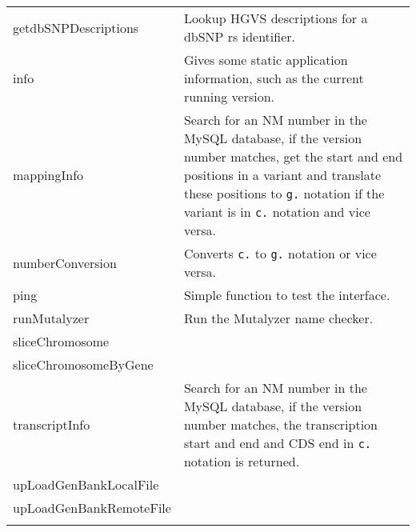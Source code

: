 \begin{longtable}{l|X}
  getdbSNPDescriptions     & Lookup HGVS descriptions for a dbSNP rs
    identifier.\\
  info                     & Gives some static application information, such as
    the current running version.\\
  mappingInfo              & Search for an NM number in the MySQL database, if
    the version number matches, get the start and end positions in a variant
    and translate these positions to \texttt{g.} notation if the variant is in
    \texttt{c.} notation and vice versa.\\
  numberConversion         & Converts \texttt{c.} to \texttt{g.} notation or
    vice versa.\\
  ping                     & Simple function to test the interface.\\
  runMutalyzer             & Run the Mutalyzer name checker.\\
  sliceChromosome          & \\
  sliceChromosomeByGene    & \\
  transcriptInfo           & Search for an NM number in the MySQL database, if
    the version number matches, the transcription start and end and CDS end in
    \texttt{c.} notation is returned.\\
  upLoadGenBankLocalFile   & \\
  upLoadGenBankRemoteFile  & \\
  \label{tab:webservices}
\end{longtable}
